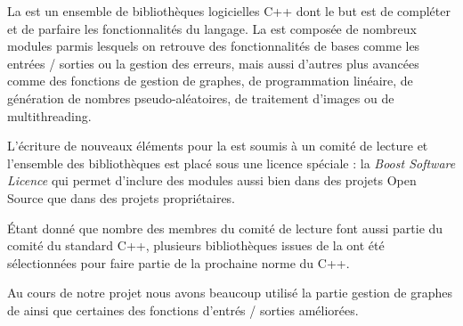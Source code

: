 
%


\par
La \boost  est un ensemble de biblioth\`eques logicielles C++ dont le but est de compléter et de parfaire les fonctionnalités du langage. La \boost est compos\'ee de nombreux modules parmis lesquels on retrouve des fonctionnalit\'es de bases comme les entr\'ees / sorties ou la gestion des erreurs, mais aussi d'autres plus avanc\'ees comme des fonctions de gestion de graphes, de programmation lin\'eaire, de g\'en\'eration de nombres pseudo-al\'eatoires, de traitement d'images ou de multithreading.
\par
L'\'ecriture de nouveaux \'el\'ements pour la \boost est soumis \`a un  comit\'e de lecture et l'ensemble des biblioth\`eques est plac\'e sous une licence sp\'eciale : la \textit{Boost Software Licence} qui permet d'inclure des modules \boost aussi bien dans des projets Open Source que dans des projets propri\'etaires.
\par
\'Etant donn\'e que nombre des membres du comit\'e de lecture font aussi partie du comit\'e du standard C++, plusieurs biblioth\`eques issues de la \boost ont \'et\'e s\'electionn\'ees pour faire partie de la prochaine norme du C++.
\par
Au cours de notre projet nous avons beaucoup utilis\'e la partie gestion de graphes de \boost ainsi que certaines des fonctions d'entr\'es / sorties am\'elior\'ees.
%
